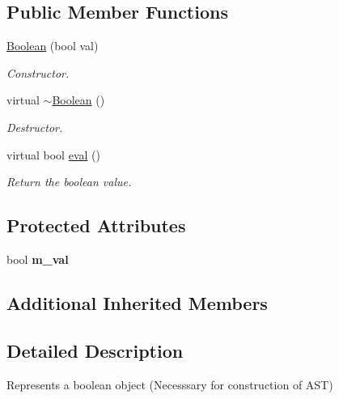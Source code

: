 \subsection*{Public Member Functions}
\begin{DoxyCompactItemize}
\item 
\hyperlink{class_boolean_a3d0ffe778a52170ae7f4b7c9e2e80f9c}{Boolean} (bool val)
\begin{DoxyCompactList}\small\item\em Constructor. \end{DoxyCompactList}\item 
\hypertarget{class_boolean_a025bfd19cd093dbbe9492fdab16c056b}{virtual \hyperlink{class_boolean_a025bfd19cd093dbbe9492fdab16c056b}{$\sim$\-Boolean} ()}\label{class_boolean_a025bfd19cd093dbbe9492fdab16c056b}

\begin{DoxyCompactList}\small\item\em Destructor. \end{DoxyCompactList}\item 
\hypertarget{class_boolean_a18504725e866dbe8f1b9fcf5f19ee4dc}{virtual bool \hyperlink{class_boolean_a18504725e866dbe8f1b9fcf5f19ee4dc}{eval} ()}\label{class_boolean_a18504725e866dbe8f1b9fcf5f19ee4dc}

\begin{DoxyCompactList}\small\item\em Return the boolean value. \end{DoxyCompactList}\end{DoxyCompactItemize}
\subsection*{Protected Attributes}
\begin{DoxyCompactItemize}
\item 
\hypertarget{class_boolean_a900417114df9124e0398b926e2cb012d}{bool {\bfseries m\-\_\-val}}\label{class_boolean_a900417114df9124e0398b926e2cb012d}

\end{DoxyCompactItemize}
\subsection*{Additional Inherited Members}


\subsection{Detailed Description}
Represents a boolean object (Necesssary for construction of A\-S\-T) 

